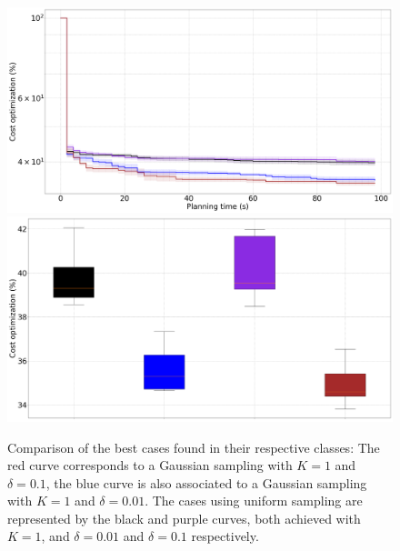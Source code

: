 \begin{figure} [htp]
    \centering
    \includegraphics[width=0.9\linewidth]{figures/appendix/comp.png} \\
    \includegraphics[width=0.9\linewidth]{figures/appendix/bplot_comp.png}
    \caption{Comparison of the best cases found in their respective classes: The red curve corresponds to a Gaussian sampling with $K = 1$ and $\delta = 0.1$, the blue curve is also associated to a Gaussian sampling with $K = 1$ and $\delta = 0.01$.
    The cases using uniform sampling are represented by the black and purple curves, both achieved with $K = 1$, and $\delta = 0.01$ and $\delta = 0.1$ respectively.}%
    \label{fig:comp}%
\end{figure}